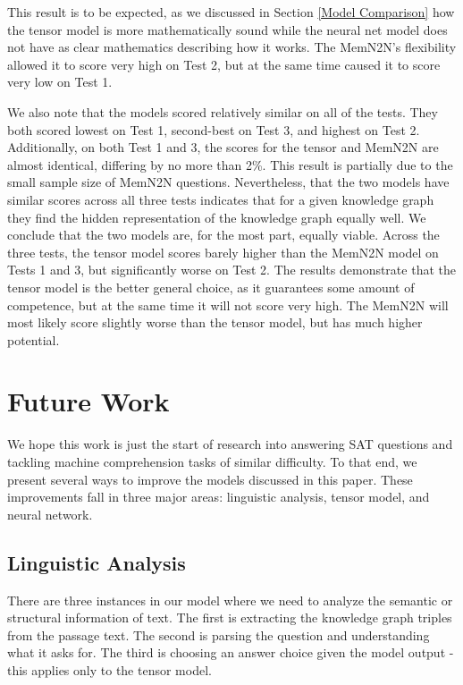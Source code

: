 \documentclass[pageno]{final_paper}
\begin{document}
This result is to be expected, as we discussed in Section \ref{Model Comparison}
how the tensor model is more mathematically sound while the neural net model
does not have as clear mathematics describing how it works. The MemN2N's
flexibility allowed it to score very high on Test 2, but at the same time caused
it to score very low on Test 1.

We also note that the models scored relatively similar on all of the tests. They
both scored lowest on Test 1, second-best on Test 3, and highest on Test 2.
Additionally, on both Test 1 and 3, the scores for the tensor and MemN2N are
almost identical, differing by no more than 2\%. This result is partially due to
the small sample size of MemN2N questions. Nevertheless, that the two models
have similar scores across all three tests indicates that for a given knowledge
graph they find the hidden representation of the knowledge graph equally well.
We conclude that the two models are, for the most part, equally viable. Across
the three tests, the tensor model scores barely higher than the MemN2N model on
Tests 1 and 3, but significantly worse on Test 2. The results demonstrate that
the tensor model is the better general choice, as it guarantees some amount of
competence, but at the same time it will not score very high. The MemN2N will
most likely score slightly worse than the tensor model, but has much higher
potential.

\section{Future Work}
\label{Future Work}

We hope this work is just the start of research into answering SAT questions and
tackling machine comprehension tasks of similar difficulty. To that end, we
present several ways to improve the models discussed in this paper. These
improvements fall in three major areas: linguistic analysis, tensor model, and
neural network.

\subsection{Linguistic Analysis}
\label{Linguistic Analysis}

There are three instances in our model where we need to analyze the semantic or
structural information of text. The first is extracting the knowledge graph
triples from the passage text. The second is parsing the question and
understanding what it asks for. The third is choosing an answer choice given the
model output - this applies only to the tensor model.
\end{document}
